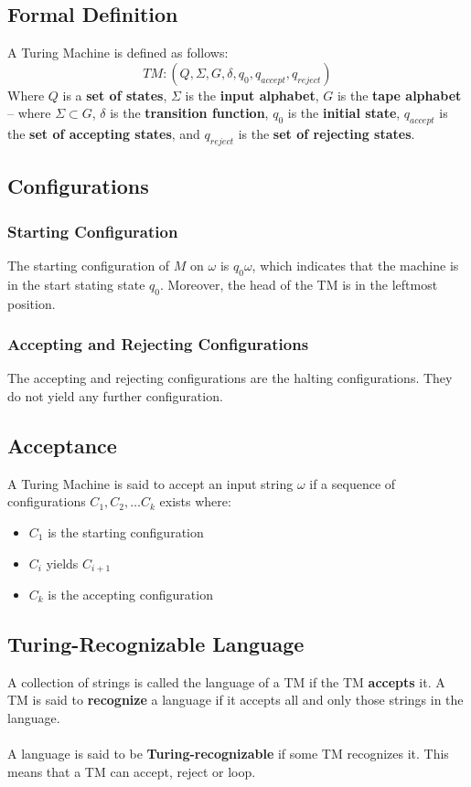 \documentclass{article}
\begin{document}
\subsection{Formal Definition}
A Turing Machine is defined as follows:
\[ TM: (Q, \Sigma, G, \delta, q_0, q_{accept}, q_{reject}) \]
Where $Q$ is a \textbf{set of states}, $\Sigma$ is the \textbf{input alphabet}, $G$ is the \textbf{tape alphabet} -- where $\Sigma \subset G$, $\delta$ is the \textbf{transition function}, $q_0$ is the \textbf{initial state}, $q_{accept}$ is the \textbf{set of accepting states}, and $q_{reject}$ is the \textbf{set of rejecting states}.

\subsection{Configurations}
\subsubsection{Starting Configuration}
The starting configuration of $M$ on $\omega$ is $q_0 \omega$, which indicates that the machine is in the start stating state $q_0$. Moreover, the head of the TM is in the leftmost position.

\subsubsection{Accepting and Rejecting Configurations}
The accepting and rejecting configurations are the halting configurations. They do not yield any further configuration.

\subsection{Acceptance}
A Turing Machine is said to accept an input string $\omega$ if a sequence of configurations $C_1, C_2, \dots C_k$ exists where:

\begin{itemize}
	\item $C_1$ is the starting configuration
	\item $C_i$ yields $C_{i+1}$
	\item $C_k$ is the accepting configuration
\end{itemize}

\subsection{Turing-Recognizable Language}
A collection of strings is called the language of a TM if the TM \textbf{accepts} it. A TM is said to \textbf{recognize} a language if it accepts all and only those strings in the language. \\ \\
A language is said to be \textbf{Turing-recognizable} if some TM recognizes it. This means that a TM can accept, reject or loop.
\end{document}

